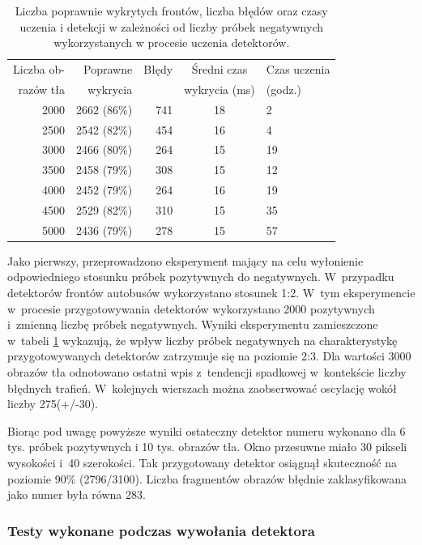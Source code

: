 \begin{table}[!h]
	\centering                                                          
	\caption{Liczba poprawnie wykrytych frontów, liczba błędów oraz czasy uczenia 
		i detekcji w zależności od liczby próbek negatywnych wykorzystanych w procesie uczenia 
		detektorów.}
	\begin{tabular}{r|r|r|c|l}
		Liczba ob-& Poprawne     & Błędy  & Średni czas    & Czas uczenia    \\
		razów tła& wykrycia     &        & wykrycia (ms) & (godz.)  \\
		\hline
		
		2000 &	2662 (86\%) &	741 &	18 & 2 \\
		2500 &	2542 (82\%) &	454 &	16 & 4 \\
		3000 &	2466 (80\%) &	264 &	15 & 19 \\
		3500 &	2458 (79\%) &	308 &	15 & 12 \\
		4000 &	2452 (79\%) &	264 &	16 & 19 \\
		4500 &	2529 (82\%) &	310 &	15 & 35 \\
		5000 &	2436 (79\%) &	278 &	15 & 57 \\
	\end{tabular} 
	\label{tab:2000pos4negFunction}
\end{table}

Jako pierwszy, przeprowadzono eksperyment mający na celu wyłonienie
odpowiedniego stosunku próbek pozytywnych do negatywnych.
W~przypadku detektorów frontów autobusów wykorzystano stosunek 1:2. W~tym eksperymencie w~procesie przygotowywania
detektorów wykorzystano 2000 pozytywnych i~zmienną liczbę próbek
negatywnych.
Wyniki eksperymentu zamieszczone w~tabeli \ref{tab:2000pos4negFunction}
wykazują, że wpływ liczby próbek negatywnych na charakterystykę
przygotowywanych detektorów zatrzymuje się na poziomie 2:3. 
Dla wartości 3000 obrazów tła odnotowano ostatni wpis z~tendencji spadkowej
w~kontekście liczby błędnych trafień. W~kolejnych wierszach
można zaobserwować oscylację wokół liczby 275(+/-30).

Biorąc pod uwagę powyższe wyniki ostateczny detektor numeru wykonano
dla 6 tys. próbek pozytywnych i 10 tys. obrazów tła. Okno przesuwne
miało 30 pikseli wysokości i~40 szerokości. Tak przygotowany
detektor osiągnął skuteczność na poziomie 90\% (2796/3100). Liczba fragmentów
obrazów błędnie zaklasyfikowana jako numer była równa 283.

\subsubsection{Testy wykonane podczas wywołania detektora}

